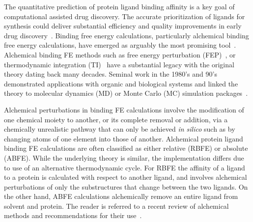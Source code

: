 \documentclass[9pt,bestpractices]{livecoms}
\begin{document}
The quantitative prediction of protein ligand binding affinity is a key goal of computational assisted drug discovery. The accurate prioritization of ligands for synthesis could deliver substantial efficiency and quality improvements in early drug discovery~\cite{abelCriticalReviewValidation2017,abelModelingValuePredictive2018}. Binding free energy calculations, particularly alchemical binding free energy calculations, have emerged as arguably the most promising tool~\cite{courniaRelativeBindingFree2017}. Alchemical binding FE methods such as free energy perturbation (FEP)~\cite{zwanzigHighTemperatureEquation1954,bennettEfficientEstimationFree1976}, or thermodynamic integration (TI)~\cite{kirkwoodQuantumStatisticsAlmost1933,kirkwoodQuantumStatisticsAlmost1934,kirkwoodStatisticalMechanicsFluid1935} have a substantial legacy with the original theory dating back many decades. Seminal work in the 1980’s and 90’s demonstrated applications with organic and biological systems and linked the theory to molecular dynamics (MD) or Monte Carlo (MC) simulation packages~\cite{jorgensenMonteCarloSimulation1985,straatsmaFreeEnergyHydrophobic1986,lybrandTheoreticalCalculationRelative1986,merzFreeEnergyPerturbation1989,pearlmanDeterminationDifferentialEffects1995,choderaAlchemicalFreeEnergy2011,mobleyPerspectiveAlchemicalFree2012}. 

Alchemical perturbations in binding FE calculations involve the modification of one chemical moiety to another, or its complete removal or addition, via a chemically unrealistic pathway that can only be achieved \textit{in silico} such as by changing atoms of one element into those of another. Alchemical protein ligand binding FE calculations are often classified as either relative (RBFE) or absolute (ABFE). While the underlying theory is similar, the implementation differs due to use of an alternative thermodynamic cycle. For RBFE the affinity of a ligand to a protein is calculated with respect to another ligand, and involves alchemical perturbations of only the substructures that change between the two ligands. On the other hand, ABFE calculations alchemically remove an entire ligand from solvent and protein. The reader is referred to a recent review of alchemical methods and recommendations for their use~\cite{meyBestPracticesAlchemical2020}.
\end{document}
